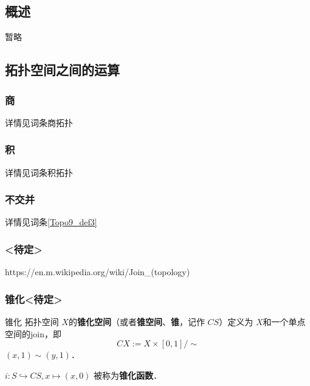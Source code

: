 
\begin{issues}
\issueDraft
\issueTODO
\issueMissDepend
\issueAbstract
\issueNeedCite
\end{issues}

\subsection{概述}

暂略

\subsection{拓扑空间之间的运算}

\subsubsection{商}

详情见词条商拓扑


\subsubsection{积}

详情见词条积拓扑


\subsubsection{不交并}

详情见词条\autoref{Topo9_def3}~


\subsubsection{<待定>}

https://en.m.wikipedia.org/wiki/Join_(topology)


\subsubsection{锥化<待定>}

\begin{definition}{锥化}
拓扑空间 $X$的\textbf{锥化空间}（或者\textbf{锥空间}、\textbf{锥}，记作 $C S$）定义为 $X$和一个单点空间的join，即
\[
    C X := X \times [0,1] / \sim
\]
$(x, 1) \sim (y, 1)$．

$i: S \hookrightarrow C S, x \mapsto (x, 0)$ 被称为\textbf{锥化函数}．
\end{definition}

